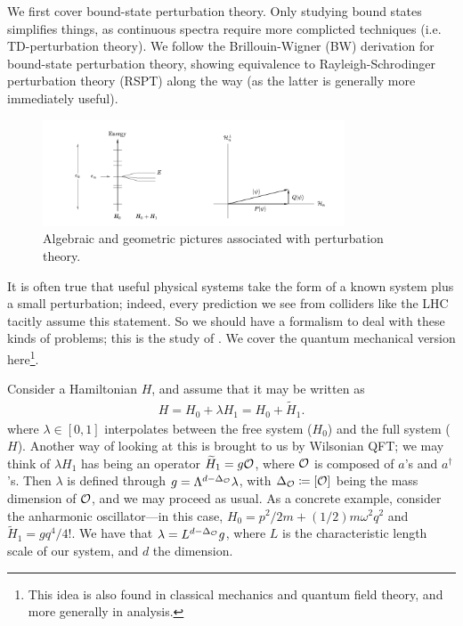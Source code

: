 \documentclass[11pt]{article}
\begin{document}
We first cover bound-state perturbation theory.
Only studying bound states simplifies things, as continuous spectra
require more complicted techniques (i.e. TD-perturbation theory).
We follow the Brillouin-Wigner (BW) derivation for bound-state perturbation
theory, showing equivalence to Rayleigh-Schrodinger perturbation theory (RSPT)
along the way (as the latter is generally more immediately useful).

\begin{figure}[H]
    \centering
    \includegraphics[width=0.8\textwidth]{Figures/QM/LJ_pertTh.png}
    \caption{Algebraic and geometric pictures associated with perturbation
    theory.}
    \label{fig:geoAlgPT}
\end{figure}

It is often true that useful physical systems take the form of a
known system plus a small perturbation; indeed, every prediction
we see from colliders like the LHC tacitly assume this statement.
So we should have a formalism to deal with these kinds of problems; 
this is the study of . We cover the quantum
mechanical version here\footnote{This idea is also found in
classical mechanics and quantum field theory, and more generally
in analysis.}.

Consider a Hamiltonian $H$, and assume that it may be written as
\begin{align*}
    H = H_0 + \lambda H_1 = H_0 + \widetilde{H}_1.
\end{align*}
where $\lambda \in [0, 1]$ interpolates between the free system ($H_0$)
and the full system ($H$). Another way of looking at this is brought to us
by Wilsonian QFT; we may think of $\lambda H_1$ has being an operator
$\widetilde{H}_1 = g \mathcal{O}$, where $\mathcal{O}$ is composed of $a$'s and $a^\dagger$'s.
Then $\lambda$ is defined through $g = \Lambda^{d - \Delta_{\mathcal{O}}} \lambda$,
with $\Delta_{\mathcal{O}} \coloneqq [\mathcal{O}]$ being the mass dimension of $\mathcal{O}$,
and we may proceed as usual. As a concrete example, consider the anharmonic 
oscillator---in this case, $H_0 = p^2/2m + (1/2)m\omega^2 q^2$ and 
$\widetilde{H}_1 = g q^4 / 4!$. We have that $\lambda = L^{d - \Delta_{\mathcal{O}}} g$, 
where $L$ is the characteristic length scale of our system, and $d$ the dimension.
\end{document}
